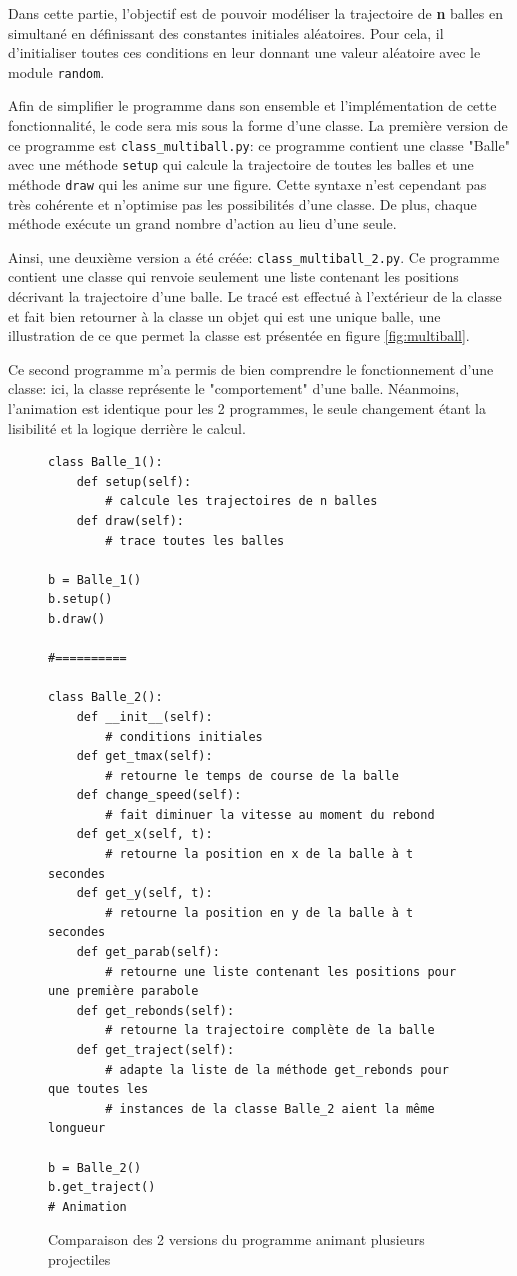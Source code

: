 \documentclass[a4paper, 11pt]{article}
\begin{document}
Dans cette partie, l'objectif est de pouvoir modéliser la trajectoire de \textbf{n} balles en simultané en définissant des constantes initiales aléatoires. Pour cela, il d'initialiser toutes ces conditions en leur donnant une valeur aléatoire avec le module \verb|random|.

Afin de simplifier le programme dans son ensemble et l'implémentation de cette fonctionnalité, le code sera mis sous la forme d'une classe. La première version de ce programme est  \verb|class_multiball.py|: ce programme contient une classe "Balle" avec une méthode \verb|setup| qui calcule la trajectoire de toutes les balles et une méthode \verb|draw| qui les anime sur une figure. Cette syntaxe n'est cependant pas très cohérente et n'optimise pas les possibilités d'une classe. De plus, chaque méthode exécute un grand nombre d'action au lieu d'une seule.

Ainsi, une deuxième version a été créée: \verb|class_multiball_2.py|. Ce programme contient une classe qui renvoie seulement une liste contenant les positions décrivant la trajectoire d'une balle. Le tracé est effectué à l'extérieur de la classe et fait bien retourner à la classe un objet qui est une unique balle, une illustration de ce que permet la classe est présentée en figure \ref{fig:multiball}.

Ce second programme m'a permis de bien comprendre le fonctionnement d'une classe: ici, la classe représente le "comportement" d'une balle. Néanmoins, l'animation est identique pour les 2 programmes, le seule changement étant la lisibilité et la logique derrière le calcul.


\begin{figure}[H]
\centering
\begin{verbatim}
class Balle_1():
    def setup(self):
        # calcule les trajectoires de n balles
    def draw(self):
        # trace toutes les balles

b = Balle_1()
b.setup()
b.draw()

#==========

class Balle_2():
    def __init__(self):
        # conditions initiales
    def get_tmax(self):
        # retourne le temps de course de la balle
    def change_speed(self): 
        # fait diminuer la vitesse au moment du rebond
    def get_x(self, t):  
        # retourne la position en x de la balle à t secondes
    def get_y(self, t):  
        # retourne la position en y de la balle à t secondes
    def get_parab(self): 
        # retourne une liste contenant les positions pour une première parabole
    def get_rebonds(self):  
        # retourne la trajectoire complète de la balle
    def get_traject(self):
        # adapte la liste de la méthode get_rebonds pour que toutes les 
        # instances de la classe Balle_2 aient la même longueur

b = Balle_2()
b.get_traject()
# Animation 
\end{verbatim}
\caption{Comparaison des 2 versions du programme animant plusieurs projectiles}
\end{figure}
\end{document}
